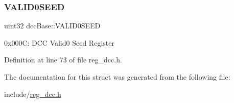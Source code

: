 \subsubsection{\texorpdfstring{V\+A\+L\+I\+D0\+S\+E\+ED}{VALID0SEED}}
{\footnotesize\ttfamily uint32 dcc\+Base\+::\+V\+A\+L\+I\+D0\+S\+E\+ED}

0x000C\+: D\+CC Valid0 Seed Register 

Definition at line 73 of file reg\+\_\+dcc.\+h.



The documentation for this struct was generated from the following file\+:\begin{DoxyCompactItemize}
\item 
include/\mbox{\hyperlink{reg__dcc_8h}{reg\+\_\+dcc.\+h}}\end{DoxyCompactItemize}
